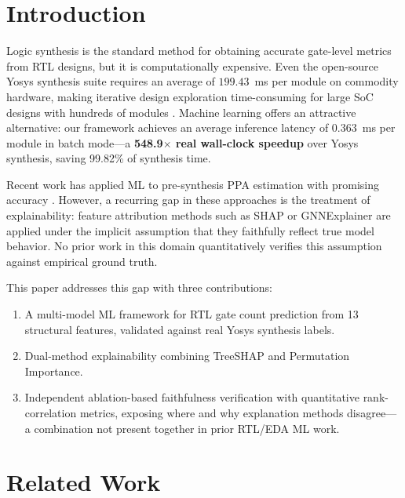 \documentclass[conference]{IEEEtran}
\begin{document}
\section{Introduction}

Logic synthesis is the standard method for obtaining accurate gate-level
metrics from RTL designs, but it is computationally expensive. Even the
open-source Yosys synthesis suite requires an average of $199.43$~ms per
module on commodity hardware, making iterative design exploration
time-consuming for large SoC designs with hundreds of modules
\cite{fang2023masterrtl}. Machine learning offers an attractive alternative:
our framework achieves an average inference latency of $0.363$~ms per module
in batch mode---a \textbf{548.9$\boldsymbol{\times}$ real wall-clock speedup}
over Yosys synthesis, saving 99.82\% of synthesis time.

Recent work has applied ML to pre-synthesis PPA estimation with promising
accuracy \cite{chattopadhyay2025mlframework, fang2023masterrtl, wu2022hls}.
However, a recurring gap in these approaches is the treatment of
explainability: feature attribution methods such as SHAP
\cite{lundberg2017shap} or GNNExplainer are applied under the implicit
assumption that they faithfully reflect true model behavior. No prior work
in this domain quantitatively verifies this assumption against empirical
ground truth.

This paper addresses this gap with three contributions:
\begin{enumerate}
  \item A multi-model ML framework for RTL gate count prediction from 13
    structural features, validated against real Yosys synthesis labels.
  \item Dual-method explainability combining TreeSHAP and Permutation
    Importance.
  \item Independent ablation-based faithfulness verification with quantitative
    rank-correlation metrics, exposing where and why explanation methods
    disagree---a combination not present together in prior RTL/EDA ML work.
\end{enumerate}

\section{Related Work}
\end{document}
